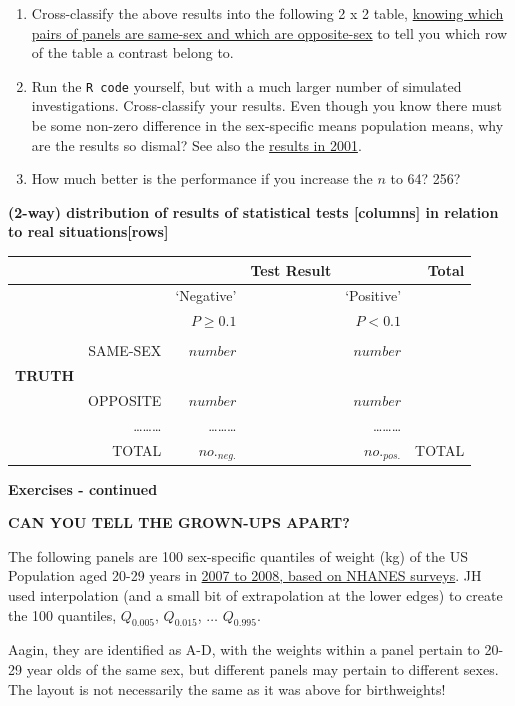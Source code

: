 \documentclass[]{book}
\begin{document}
\begin{enumerate}
\def\labelenumi{\arabic{enumi}.}
\setcounter{enumi}{1}
\item
  Cross-classify the above results into the following 2 x 2 table, \href{http://www.biostat.mcgill.ca/hanley/statbook/4panelsOfSexSpecificBirthWeights.txt}{knowing which pairs of panels are same-sex and which are opposite-sex} to tell you which row of the table a contrast belong to.
\item
  Run the \texttt{R\ code} yourself, but with a much larger number of simulated investigations. Cross-classify your results. Even though you know there must be some non-zero difference in the sex-specific means population means, why are the results so dismal? See also the \href{http://www.medicine.mcgill.ca/epidemiology/hanley/c607/ch06/telling_sexes_apart.pdf}{results in
  2001}.
\item
  How much better is the performance if you increase the \(n\) to 64? 256?
\end{enumerate}

\textbf{(2-way) distribution of results of statistical tests {[}columns{]} in relation to real situations{[}rows{]}}

\begin{longtable}[]{@{}lrrrrr@{}}
\toprule
& & & Test Result & & Total\tabularnewline
\midrule
\endhead
& & `Negative' & & `Positive' &\tabularnewline
& & \(P \ge 0.1\) & & \(P \lt 0.1\) &\tabularnewline
& & & & &\tabularnewline
& SAME-SEX & \(number\) & & \(number\) &\tabularnewline
\textbf{TRUTH} & & & & &\tabularnewline
& OPPOSITE & \(number\) & & \(number\) &\tabularnewline
& \ldots{}\ldots{}\ldots{} & \ldots{}\ldots{}\ldots{} & & \ldots{}\ldots{}\ldots{} &\tabularnewline
& TOTAL & \(no._{neg.}\) & & \(no._{pos.}\) & TOTAL\tabularnewline
\bottomrule
\end{longtable}

\textbf{Exercises - continued}

\textbf{CAN YOU TELL THE GROWN-UPS APART?}

The following panels are 100 sex-specific quantiles of weight (kg) of the US Population aged 20-29 years in \href{https://www2.census.gov/library/publications/2010/compendia/statab/130ed/tables/11s0205.pdf}{2007 to 2008, based on NHANES surveys}. JH used interpolation (and a small bit of extrapolation at the lower edges) to create the 100 quantiles, \(Q_{0.005}\), \(Q_{0.015}\), \(\dots\) \(Q_{0.995}\).

Aagin, they are identified as A-D, with the weights within a panel pertain to 20-29 year olds of the same sex, but different panels may pertain to different sexes. The layout is not necessarily the same as it was above for birthweights!
\end{document}
